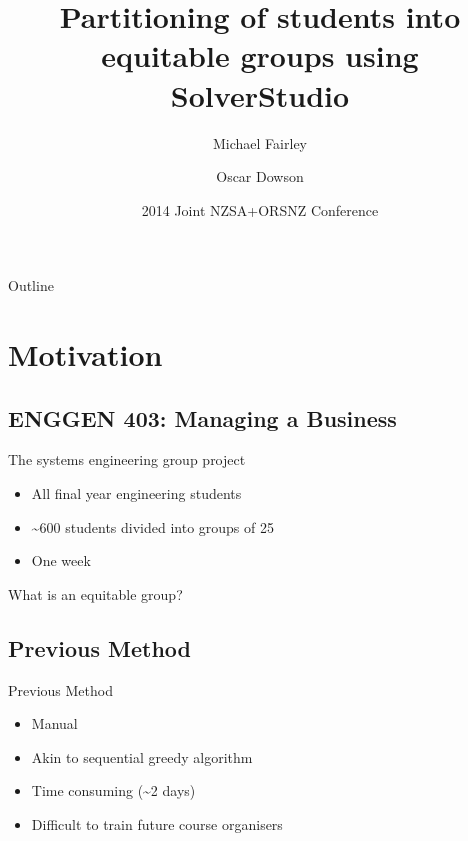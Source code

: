 \documentclass{beamer}
\title[Partitioning students into equitable groups] %
{Partitioning of students into equitable groups using SolverStudio}
\author[Michael Fairley and Oscar Dowson] %
{Michael Fairley \and Oscar Dowson}
\institute[University of Auckland] %
{
  Department of Engineering Science\\
  University of Auckland
}
\date[] %
{2014 Joint NZSA+ORSNZ Conference}
\begin{document}
\begin{frame}
  \titlepage
\end{frame}

\begin{frame}{Outline}
  \tableofcontents
\end{frame}





\section{Motivation}

\subsection{ENGGEN 403: Managing a Business}

\begin{frame}{The systems engineering group project}
  \begin{itemize}
    \item All final year engineering students
    \item \textasciitilde600 students divided into groups of 25
    \item One week
  \end{itemize}
\end{frame}

\begin{frame}{What is an equitable group?}


\end{frame}

\subsection{Previous Method}
\begin{frame}{Previous Method}
  \begin{itemize}
    \item Manual
    \item Akin to sequential greedy algorithm
    \item Time consuming (\textasciitilde 2 days)
    \item Difficult to train future course organisers
  \end{itemize}
\end{frame}
\end{document}
